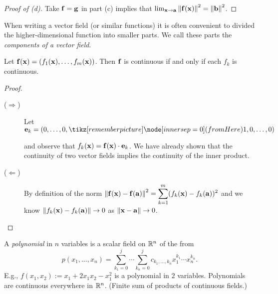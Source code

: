 \begin{proof}[Proof of (d)]
    Take \(\mathbf{f} = \mathbf{g}\) in part (c) implies that \(   \lim_{\mathbf{x} \to \mathbf{a}} \left\|\mathbf{f}(\mathbf{x})\right\|^2 = \left\|\mathbf{b}\right\|^2\).
\end{proof}


When writing a vector field (or similar functions) it is often convenient to divided the higher-dimensional function into smaller parts.
We call these parts the \emph{components of a vector field}.

\begin{theorem}
    Let \(\mathbf{f}(\mathbf{x}) = \left(f_1(\mathbf{x}),\ldots,f_m(\mathbf{x}) \right)\).
    Then \(\mathbf{f}\) is continuous if and only if each \(f_k\) is continuous.
\end{theorem}
\begin{proof}
    \begin{description}
        \item[(\(\Rightarrow\))]
            Let
            \( \ee_k=(0,\ldots,0,\here{1}{fromHere},0,\ldots,0)  \)
            and observe that \(f_k(\mathbf{x}) = \mathbf{f}(\mathbf{x})\cdot \mathbf{e}_k\).
            We have already shown that the continuity of two vector fields implies the continuity of the inner product.
        \item[(\(\Leftarrow \))]
            By definition of the norm
            \(\left\|\mathbf{f}(\mathbf{x})-\mathbf{f}(\mathbf{a})\right\|^2 = \displaystyle\sum_{k=1}^{m}(f_k(\mathbf{x})-f_k(\mathbf{a}))^2\)
            and we know \(\left\|f_k(\mathbf{x})-f_k(\mathbf{a})\right\| \to 0\) as \(\left\|\mathbf{x}-\mathbf{a}\right\|\to 0\). \qedhere
    \end{description}
\end{proof}



\begin{example*}[polynomials]
    A  \emph{polynomial} in \(n\) variables is a scalar field on \(\mathbb{R}^n\) of the from
    \[
        p(x_1,\ldots,x_n)
        = \sum_{k_1=0}^{j}\cdots \sum_{k_n=0}^{j} c_{k_1,\dots,k_n} x_1^{k_1}\cdots x_n^{k_n}.
    \]
    E.g., \(f(x_1,x_2):= x_1 + 2x_1x_2 - x_1^2\) is a polynomial in \(2\) variables.
    Polynomials are continuous everywhere in \(\mathbb{R}^n\). (Finite sum of products of continuous fields.)
\end{example*}

